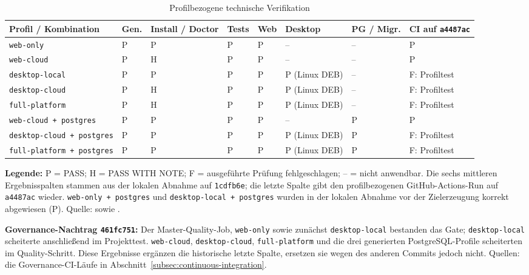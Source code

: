 \begin{table}[H]
  \centering
  \scriptsize
  \renewcommand{\arraystretch}{1.1}
  \caption{Profilbezogene technische Verifikation}
  \label{tab:verification-matrix}
  \begin{tabularx}{\textwidth}{@{}p{}>{\centering\arraybackslash}p{}>{\centering\arraybackslash}p{}>{\centering\arraybackslash}p{}>{\centering\arraybackslash}p{}>{\centering\arraybackslash}p{}>{\centering\arraybackslash}p{}>{\raggedright\arraybackslash}X@{}}
    \toprule
    \textbf{Profil / Kombination} & \textbf{Gen.} & \textbf{Install / Doctor} & \textbf{Tests} & \textbf{Web} & \textbf{Desktop} & \textbf{PG / Migr.} & \textbf{CI auf \texttt{a4487ac}} \\
    \midrule
    \texttt{web-only} & P & P & P & P & -- & -- & P \\
    \texttt{web-cloud} & P & H & P & P & -- & -- & P \\
    \texttt{desktop-local} & P & P & P & P & P (Linux DEB) & -- & F: Profiltest \\
    \texttt{desktop-cloud} & P & H & P & P & P (Linux DEB) & -- & F: Profiltest \\
    \texttt{full-platform} & P & H & P & P & P (Linux DEB) & -- & F: Profiltest \\
    \midrule
    \texttt{web-cloud + postgres} & P & P & P & P & -- & P & P \\
    \texttt{desktop-cloud + postgres} & P & P & P & P & P (Linux DEB) & P & F: Profiltest \\
    \texttt{full-platform + postgres} & P & P & P & P & P (Linux DEB) & P & F: Profiltest \\
    \bottomrule
  \end{tabularx}
  \smallskip
  \begin{minipage}{\textwidth}
    \scriptsize
    \textbf{Legende:} P = PASS; H = PASS WITH NOTE; F = ausgeführte Prüfung fehlgeschlagen;
    -- = nicht anwendbar. Die sechs mittleren Ergebnisspalten stammen aus der lokalen Abnahme
    auf \texttt{1cdfb6e}; die letzte Spalte gibt den profilbezogenen GitHub-Actions-Run auf
    \texttt{a4487ac} wieder. \texttt{web-only + postgres} und
    \texttt{desktop-local + postgres} wurden in der lokalen Abnahme vor der Zielerzeugung
    korrekt abgewiesen (P). Quelle: \textcite{kleiveist2026acceptance} sowie
    \textcite{kleiveist2026ci-profiles-run,kleiveist2026ci-postgres-run}.

    \textbf{Governance-Nachtrag \texttt{461fc751}:} Der Master-Quality-Job,
    \texttt{web-only} sowie zunächst \texttt{desktop-local} bestanden das Gate;
    \texttt{desktop-local} scheiterte anschließend im Projekttest.
    \texttt{web-cloud}, \texttt{desktop-cloud}, \texttt{full-platform} und die
    drei generierten PostgreSQL-Profile scheiterten im Quality-Schritt. Diese
    Ergebnisse ergänzen die historische letzte Spalte, ersetzen sie wegen des
    anderen Commits jedoch nicht. Quellen: die Governance-CI-Läufe in
    Abschnitt~\ref{subsec:continuous-integration}.
  \end{minipage}
\end{table}
